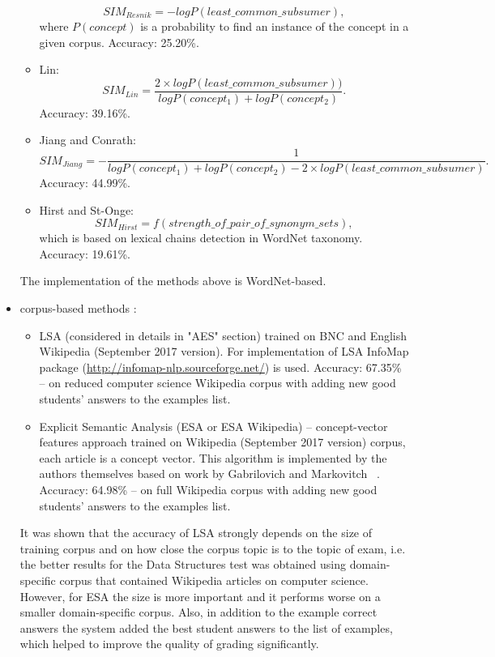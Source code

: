\begin{itemize}
\begin{itemize}
\begin{equation}
SIM_{Resnik} = -log P(least\_common\_subsumer),
\end{equation}
where $P(concept)$ is a probability to find an instance of the concept in a given corpus. Accuracy: 25.20\%.
\item Lin:
\begin{equation} \label{eq:Lin}
SIM_{Lin} = \frac{2 \times log P(least\_common\_subsumer))}{log P(concept_1) + log P(concept_2)}.
\end{equation}
Accuracy: 39.16\%.
\item Jiang and Conrath:
\begin{equation} \label{eq:Jiang}
SIM_{Jiang} = - \frac{1}{log P(concept_1) + log P(concept_2) - 2 \times log P(least\_common\_subsumer) }.
\end{equation}
Accuracy: 44.99\%.
\item Hirst and St-Onge:
\begin{equation} \label{eq:Hirst}
SIM_{Hirst} = f(strength\_of\_pair\_of\_synonym\_sets),
\end{equation}
which is based on lexical chains detection in WordNet taxonomy. Accuracy: 19.61\%.
\end{itemize}
The implementation of the methods above is WordNet-based.
\item corpus-based methods :
\begin{itemize}
\item LSA (considered in details in "AES" section) trained on BNC and English Wikipedia (September 2017 version). For implementation of LSA InfoMap package (\url{http://infomap-nlp.sourceforge.net/}) is used. Accuracy: 67.35\% -- on reduced computer science Wikipedia corpus with adding new good students' answers to the examples list.
\item Explicit Semantic Analysis (ESA or ESA Wikipedia) -- concept-vector features approach trained on Wikipedia (September 2017 version) corpus, each article is a concept vector. This algorithm is implemented by the authors themselves based on work by Gabrilovich and Markovitch ~\cite{Gabrilovich}. Accuracy: 64.98\% -- on full Wikipedia corpus with adding new good students' answers to the examples list.
\end{itemize}
It was shown that the accuracy of LSA strongly depends on the size of training corpus and on how close the corpus topic is to the topic of exam, i.e. the better results for the Data Structures test was obtained using domain-specific corpus that contained Wikipedia articles on computer science. However, for ESA the size is more important and it performs worse on a smaller domain-specific corpus. Also, in addition to the example correct answers the system added the best student answers to the list of examples, which helped to improve the quality of grading significantly. 
\end{itemize}

